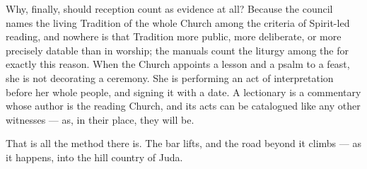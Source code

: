 Why, finally, should reception count as evidence at all? Because the
council names the living Tradition of the whole Church among the criteria
of Spirit-led reading, and nowhere is that Tradition more public, more
deliberate, or more precisely datable than in worship; the manuals count
the liturgy among the  for exactly this reason.
When the Church appoints a lesson and a psalm to a feast, she is not
decorating a ceremony. She is performing an act of interpretation before
her whole people, and signing it with a date. A lectionary is a commentary
whose author is the reading Church, and its acts can be catalogued like
any other witnesses --- as, in their place, they will be.

That is all the method there is. The bar lifts, and the road beyond it
climbs --- as it happens, into the hill country of Juda.
